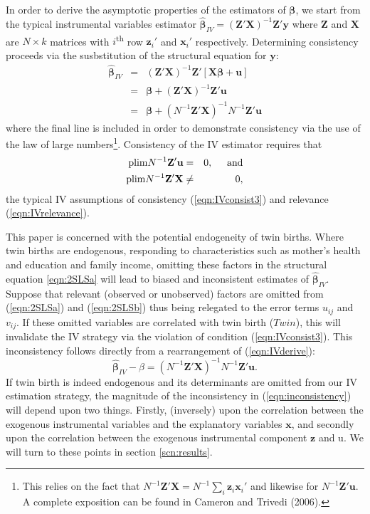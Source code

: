 \documentclass{article}[11pt,subeqn]
\newcommand{\vect}[1]{\mathbf{#1}}
\begin{document}
\begin{spacing}{1.5}
In order to derive the asymptotic properties of the estimators of $\vect{\beta}$, we start from the typical instrumental variables estimator
$\vect{\hat{\beta}}_{IV}=(\vect{Z}'\vect{X})^{-1}\vect{Z}'\vect{y} $ where $\vect{Z}$ and $\vect{X}$ are $N \times k$ matrices with $i$\textsuperscript{th} 
row $\vect{z}_i'$ and $\vect{x}_i'$ respectively.  Determining consistency proceeds via the susbstitution of the structural equation for $\vect{y}$:
\vspace{-5mm}
\begin{eqnarray}
\label{eqn:IVderive}
\vect{\hat{\beta}}_{IV}&=&(\vect{Z}'\vect{X})^{-1}\vect{Z}'[\vect{X\beta}+\vect{u}] \nonumber\\
&=&\vect{\beta}+(\vect{Z}'\vect{X})^{-1}\vect{Z}'\vect{u}\nonumber\\
&=&\vect{\beta}+(N^{-1}\vect{Z}'\vect{X})^{-1}N^{-1}\vect{Z}'\vect{u}
\end{eqnarray}
where the final line is included in order to demonstrate consistency via the use of the law of large numbers\footnote{This relies
on the fact that $N^{-1}\vect{Z}'\vect{X}=N^{-1}\sum_i\vect{z}_i\vect{x}_i'$ and likewise for $N^{-1}\vect{Z}'\vect{u}$.  A
complete exposition can be found in Cameron and Trivedi (2006).}.  Consistency of the IV estimator requires that
\begin{eqnarray}
\mathrm{plim} N^{-1}\vect{Z'u}&=&0, \hspace{5mm}\mathrm{and} \label{eqn:IVconsist3}\\ 
\mathrm{plim} N^{-1}\vect{Z'X}&\neq&0, \label{eqn:IVrelevance}
\end{eqnarray}
the typical IV assumptions of consistency (\ref{eqn:IVconsist3}) and relevance (\ref{eqn:IVrelevance}).  

This paper is concerned with the potential endogeneity of twin births.  Where twin births are endogenous, responding to characteristics such as mother's 
health and education and family income, omitting these factors in the structural equation \ref{eqn:2SLSa} will lead to biased and inconsistent estimates of 
$\vect{\hat{\beta}}_{IV}$.  Suppose that relevant (observed or unobserved) factors are omitted from (\ref{eqn:2SLSa}) and (\ref{eqn:2SLSb}) thus being 
relegated to the error terms $u_{ij}$ and $v_{ij}$.  If these omitted variables are correlated with twin birth ($Twin$), this will invalidate the IV strategy via 
the violation of condition (\ref{eqn:IVconsist3}).  This inconsistency follows directly from a rearrangement of (\ref{eqn:IVderive}):
\begin{equation}
\label{eqn:inconsistency}
\vect{\hat{\beta}}_{IV}-\beta=(N^{-1}\vect{Z}'\vect{X})^{-1}N^{-1}\vect{Z}'\vect{u}.
\end{equation}
If twin birth is indeed endogenous and its determinants are omitted from our IV estimation strategy, the magnitude of the inconsistency in 
(\ref{eqn:inconsistency}) will depend upon two things.  Firstly, (inversely) upon the correlation between the exogenous instrumental
variables and the explanatory variables $\vect{x}$, and secondly upon the correlation between the exogenous instrumental component
$\vect{z}$ and u.  We will turn to these points in section \ref{scn:results}.


\end{spacing}
\end{document}
